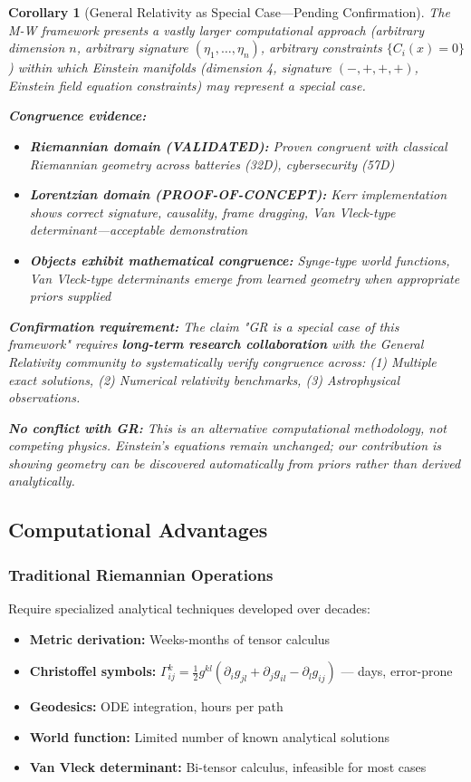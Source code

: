 \documentclass[11pt,a4paper]{article}
\newtheorem{corollary}{Corollary}
\begin{document}
\begin{corollary}[General Relativity as Special Case—Pending Confirmation]
The M-W framework presents a vastly larger computational approach (arbitrary dimension $n$, arbitrary signature $(\eta_1,\ldots,\eta_n)$, arbitrary constraints $\{C_i(x)=0\}$) within which Einstein manifolds (dimension 4, signature $(-,+,+,+)$, Einstein field equation constraints) \emph{may represent a special case}.

\textbf{Congruence evidence:}
\begin{itemize}
\item \textbf{Riemannian domain (VALIDATED):} Proven congruent with classical Riemannian geometry across batteries (32D), cybersecurity (57D)
\item \textbf{Lorentzian domain (PROOF-OF-CONCEPT):} Kerr implementation shows correct signature, causality, frame dragging, Van Vleck-type determinant—acceptable demonstration
\item \textbf{Objects exhibit mathematical congruence:} Synge-type world functions, Van Vleck-type determinants emerge from learned geometry when appropriate priors supplied
\end{itemize}

\textbf{Confirmation requirement:} The claim "GR is a special case of this framework" requires \textbf{long-term research collaboration} with the General Relativity community to systematically verify congruence across:
(1) Multiple exact solutions, (2) Numerical relativity benchmarks, (3) Astrophysical observations.

\textbf{No conflict with GR:} This is an alternative computational methodology, not competing physics. Einstein's equations remain unchanged; our contribution is showing geometry can be discovered automatically from priors rather than derived analytically.
\end{corollary}

\subsection{Computational Advantages}

\subsubsection{Traditional Riemannian Operations}

Require specialized analytical techniques developed over decades:

\begin{itemize}
\item \textbf{Metric derivation:} Weeks-months of tensor calculus
\item \textbf{Christoffel symbols:} $\Gamma^k_{ij} = \frac{1}{2}g^{kl}(\partial_i g_{jl} + \partial_j g_{il} - \partial_l g_{ij})$ — days, error-prone
\item \textbf{Geodesics:} ODE integration, hours per path
\item \textbf{World function:} Limited number of known analytical solutions
\item \textbf{Van Vleck determinant:} Bi-tensor calculus, infeasible for most cases
\end{itemize}
\end{document}
